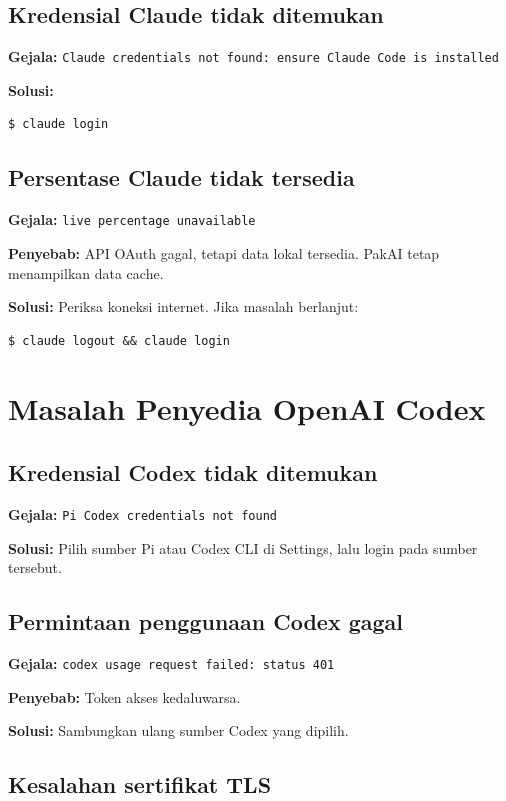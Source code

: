 \subsection{Kredensial Claude tidak ditemukan}

\textbf{Gejala:} \texttt{Claude credentials not found: ensure Claude Code is installed}

\textbf{Solusi:}
\begin{lstlisting}[style=terminal]
$ claude login
\end{lstlisting}

\subsection{Persentase Claude tidak tersedia}

\textbf{Gejala:} \texttt{live percentage unavailable}

\textbf{Penyebab:} API OAuth gagal, tetapi data lokal tersedia. PakAI tetap
menampilkan data cache.

\textbf{Solusi:} Periksa koneksi internet. Jika masalah berlanjut:
\begin{lstlisting}[style=terminal]
$ claude logout && claude login
\end{lstlisting}

\section{Masalah Penyedia OpenAI Codex}

\subsection{Kredensial Codex tidak ditemukan}

\textbf{Gejala:} \texttt{Pi Codex credentials not found}

\textbf{Solusi:} Pilih sumber Pi atau Codex CLI di Settings, lalu login pada
sumber tersebut.

\subsection{Permintaan penggunaan Codex gagal}

\textbf{Gejala:} \texttt{codex usage request failed: status 401}

\textbf{Penyebab:} Token akses kedaluwarsa.

\textbf{Solusi:} Sambungkan ulang sumber Codex yang dipilih.

\subsection{Kesalahan sertifikat TLS}

